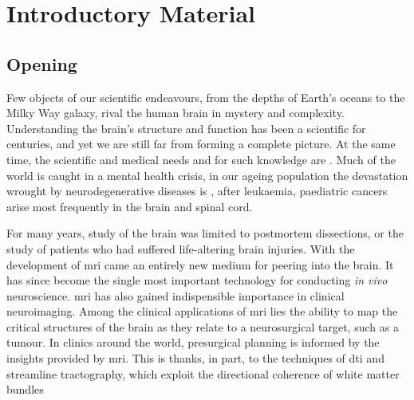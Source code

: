 \chapter{Introductory Material}
\label{chapterlabel0}

\section{Opening}

Few objects of our scientific endeavours, from the depths of Earth's oceans to the Milky Way galaxy, rival the human brain in mystery and complexity.
Understanding the brain's structure and function has been a scientific  for centuries, and yet we are still far from forming a complete picture.
At the same time, the scientific and medical needs and for such knowledge are .
Much of the world is caught in a mental health crisis, in our ageing population the devastation wrought by neurodegenerative diseases is , after leukaemia, paediatric cancers arise most frequently in the brain and spinal cord.

For many years, study of the brain was limited to postmortem dissections, or the study of patients who had suffered life-altering brain injuries.
With the development of \gls{mri} came an entirely new medium for peering into the brain.
It has since become the single most important  technology for conducting \textit{in vivo} neuroscience.
\Gls{mri} has also gained indispensible importance in clinical neuroimaging.
Among the clinical applications of \gls{mri} lies the ability to map the critical structures of the brain as they relate to a neurosurgical target, such as a tumour.
In clinics around the  world, presurgical planning is informed by the insights provided by  \gls{mri}.
This is thanks, in part, to the techniques of \gls{dti} and streamline tractography, which exploit the directional coherence of white matter bundles 

